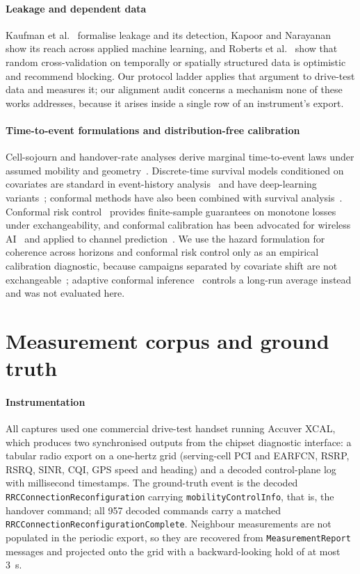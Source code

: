 \documentclass[5p,times,twocolumn]{elsarticle}
\begin{document}
\paragraph{Leakage and dependent data} Kaufman et al.~\cite{ref36} formalise leakage and its detection, Kapoor and Narayanan~\cite{ref56} show its reach across applied machine learning, and Roberts et al.~\cite{ref35} show that random cross-validation on temporally or spatially structured data is optimistic and recommend blocking. Our protocol ladder applies that argument to drive-test data and measures it; our alignment audit concerns a mechanism none of these works addresses, because it arises inside a single row of an instrument's export.

\paragraph{Time-to-event formulations and distribution-free calibration} Cell-sojourn and handover-rate analyses derive marginal time-to-event laws under assumed mobility and geometry~\cite{ref42,ref43,ref44}. Discrete-time survival models conditioned on covariates are standard in event-history analysis~\cite{ref48,ref49,ref50} and have deep-learning variants~\cite{ref16,ref17}; conformal methods have also been combined with survival analysis~\cite{ref18}. Conformal risk control~\cite{ref21,ref22} provides finite-sample guarantees on monotone losses under exchangeability, and conformal calibration has been advocated for wireless AI~\cite{ref19,ref20} and applied to channel prediction~\cite{ref55}. We use the hazard formulation for coherence across horizons and conformal risk control only as an empirical calibration diagnostic, because campaigns separated by covariate shift are not exchangeable~\cite{ref51,ref52}; adaptive conformal inference~\cite{ref53} controls a long-run average instead and was not evaluated here.

\section{Measurement corpus and ground truth}
\label{sec:corpus}

\paragraph{Instrumentation} All captures used one commercial drive-test handset running Accuver XCAL, which produces two synchronised outputs from the chipset diagnostic interface: a tabular radio export on a one-hertz grid (serving-cell PCI and EARFCN, RSRP, RSRQ, SINR, CQI, GPS speed and heading) and a decoded control-plane log with millisecond timestamps. The ground-truth event is the decoded \texttt{RRCConnectionReconfiguration} carrying \texttt{mobilityControlInfo}, that is, the handover command; all 957 decoded commands carry a matched \texttt{RRCConnectionReconfigurationComplete}. Neighbour measurements are not populated in the periodic export, so they are recovered from \texttt{MeasurementReport} messages and projected onto the grid with a backward-looking hold of at most 3~s.
\end{document}
